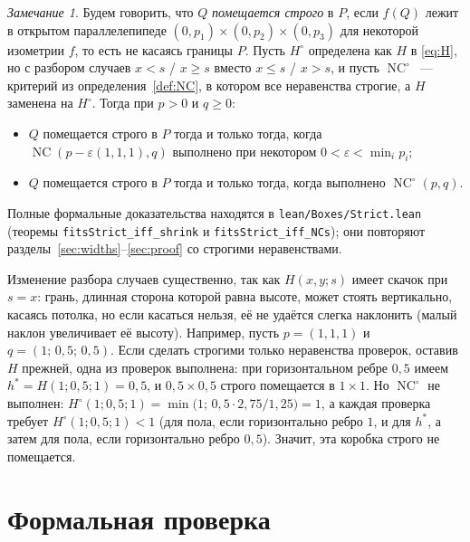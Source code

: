 \documentclass[11pt]{article}
\theoremstyle{definition}
\theoremstyle{remark}
\newtheorem{remark}[theorem]{Замечание}
\newcommand{\NC}{\operatorname{NC}}
\begin{document}
\begin{remark}\label{rem:strict}
Будем говорить, что $Q$ \emph{помещается строго} в $P$, если $f(Q)$ лежит в открытом параллелепипеде
$(0,p_1)\times(0,p_2)\times(0,p_3)$ для некоторой изометрии $f$, то есть не касаясь границы $P$.
Пусть $H^\circ$ определена как $H$ в \eqref{eq:H}, но с разбором случаев $x<s$ / $x\ge s$ вместо
$x\le s$ / $x>s$, и пусть $\NC^\circ$~--- критерий из определения~\ref{def:NC}, в котором все
неравенства строгие, а $H$ заменена на $H^\circ$. Тогда при $p>0$ и $q\ge0$:
\begin{itemize}
\item $Q$ помещается строго в $P$ тогда и только тогда, когда $\NC(p-\varepsilon(1,1,1),q)$ выполнено
при некотором $0<\varepsilon<\min_ip_i$;
\item $Q$ помещается строго в $P$ тогда и только тогда, когда выполнено $\NC^\circ(p,q)$.
\end{itemize}
Полные формальные доказательства находятся в \texttt{lean/Boxes/Strict.lean} (теоремы
\texttt{fitsStrict\_iff\_shrink} и \texttt{fitsStrict\_iff\_NCs}); они повторяют
разделы~\ref{sec:widths}--\ref{sec:proof} со строгими неравенствами.

Изменение разбора случаев существенно, так как $H(x,y;s)$ имеет скачок при $s=x$: грань, длинная
сторона которой равна высоте, может стоять вертикально, касаясь потолка, но если касаться нельзя, её
не удаётся слегка наклонить (малый наклон увеличивает её высоту). Например, пусть $p=(1,1,1)$ и
$q=(1;\,0{,}5;\,0{,}5)$. Если сделать строгими только неравенства проверок, оставив $H$ прежней, одна из
проверок выполнена: при горизонтальном ребре $0{,}5$ имеем $h^*=H(1;0{,}5;1)=0{,}5$, и $0{,}5\times0{,}5$ строго помещается в
$1\times1$. Но $\NC^\circ$ не выполнен: $H^\circ(1;0{,}5;1)=\min\bigl(1;\,0{,}5\cdot2{,}75/1{,}25\bigr)=1$,
а каждая проверка требует $H^\circ(1;0{,}5;1)<1$ (для пола, если горизонтально ребро $1$, и для $h^*$, а
затем для пола, если горизонтально ребро $0{,}5$). Значит, эта коробка строго не помещается.
\end{remark}

\section{Формальная проверка}\label{sec:lean}
\end{document}
